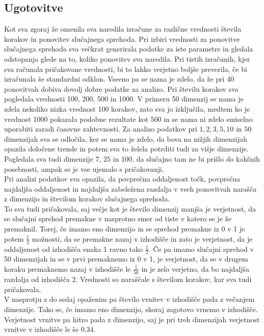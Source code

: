 \documentclass[a4paper,oneside,12pt]{article}
\begin{document}
\subsection{Ugotovitve}
Kot sva zgoraj že omenila sva naredila izračune za različne vrednosti števila korakov in ponovitev slučajnega sprehoda. Pri izbiri vrednosti za ponovitve slučajnega sprehoda sva večkrat generirala podatke za iste parametre in gledala odstopanja glede na to, koliko ponovitev sva naredila. Pri tistih izračunih, kjer sva računala pričakovane vrednosti, bi to lahko verjetno boljše preverila, če bi izračunala še standardni odklon. Vseeno pa se nama je zdelo, da že pri 40 ponovitvah dobiva dovolj dobre podatke za analizo. Pri številu korakov sva pogledala vrednosti 100, 200, 500 in 1000. V primeru 50 dimenzij se nama je zdela nekoliko nizka vrednost 100 korakov, zato sva jo izključila, medtem ko je vrednost 1000 pokazala podobne rezultate kot 500 in se nama ni zdelo smiselno uporabiti zaradi časovne zahtevnosti. Za analizo podatkov pri $1, 2, 3 , 5, 10$ in $50$ dimenzijah sva se odločila, ker se nama je zdelo, da bova na nižjih dimenzijah opazila določene trende in potem
sva to želela potrditi tudi za višje dimenzije. Pogledala sva tudi dimenzije 7, 25 in 100, da slučajno tam ne bi prišlo do kakšnih posebnosti, ampak se je vse ujemalo s pričakovanji. \\
Pri analizi podatkov sva opazila, da povprečna oddaljenost točk, povprečna najdaljša oddaljenost in najdaljša zabeležena razdalja v vseh ponovitvah narašča z dimenzijo in številom korakov slučajnega sprehoda. \\
To sva tudi pričakovala, saj večje kot je število dimenzij manjša je verjetnost, da se slučajni sprehod premakne v nasprotno smer od tiste v katero se je že premaknil. 
Torej, če imamo eno dimenzijo in se sprehod premakne iz 0 v 1 je potem $\frac{1}{2}$ možnosti, da se premakne nazaj v izhodišče in zato je verjetnost, da je oddaljenost od izhodišča enaka 1 ravno tako $\frac{1}{2}$. Če pa imamo slučajni sprehod v 50 dimenzijah in se v prvi premaknemo iz 0 v 1, je verjetnost, da se v drugem koraku premaknemo nazaj v izhodišče le $\frac{1}{50}$ in je zelo verjetno, da bo najdaljša razdalja od izhodišča 2. Vrednosti so naraščale s številom korakov, kar sva tudi pričakovala. \\
V nasprotju z do sedaj opaženim pa število vrnitev v izhodišče pada z večanjem dimenzije. Tako se, če imamo eno dimenzijo, skoraj zagotovo vrnemo v izhodišče.  Verjetnost vrnitve pa hitro pada z dimenzijo, saj je pri treh dimenzijah verjetnost vrnitve v izhodišče le še 0.34. \\
\end{document}
